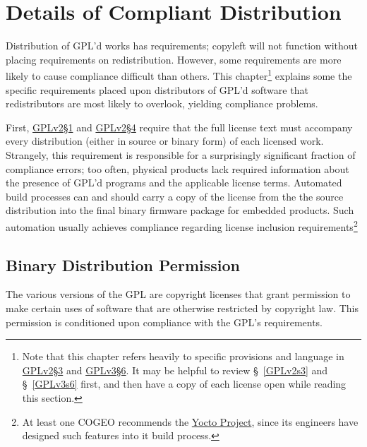 \chapter{Details of Compliant Distribution}

Distribution of GPL'd works has requirements; copyleft will not function
without placing requirements on redistribution.  However, some requirements
are more likely to cause compliance difficult than others.  This
chapter\footnote{Note that this chapter refers heavily to specific provisions
  and language in
  \hyperref[GPLv2s3-full-text]{GPLv2\S3}
  and \hyperref[GPLv3s6-full-text]{GPLv3\S6}.
  It may be helpful  to review \S~\ref{GPLv2s3} and \S~\ref{GPLv3s6} first,
  and then have a copy of each license open while reading this
  section.}  explains some the specific requirements placed upon
distributors of GPL'd software that redistributors are most likely to
overlook, yielding compliance problems.

First, \hyperref[GPLv2s1]{GPLv2\S1} and \hyperref[GPLv2s4]{GPLv2\S4} require
that the full license text must accompany every distribution (either in
source or binary form) of each licensed work.  Strangely, this requirement is
responsible for a surprisingly significant fraction of compliance errors; too
often, physical products lack required information about the presence of
GPL’d programs and the applicable license terms.  Automated build processes
can and should carry a copy of the license from the the source distribution
into the final binary firmware package for embedded products.  Such
automation usually achieves compliance regarding license inclusion
requirements\footnote{At least one COGEO recommends the
  \href{https://www.yoctoproject.org/}{Yocto Project}, since its engineers
  have designed such features into it build process.}

\section{Binary Distribution Permission}
\label{binary-distribution-permission}


The various versions of the GPL are copyright licenses that grant
permission to make certain uses of software that are otherwise restricted
by copyright law.  This permission is conditioned upon compliance with the
GPL's requirements.

